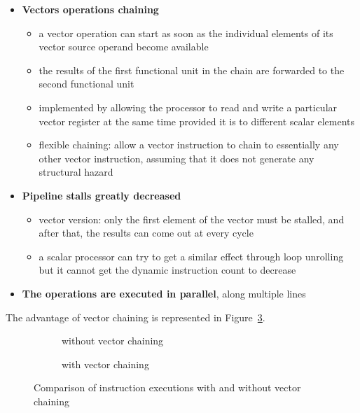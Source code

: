 \documentclass[english]{article}
\begin{document}
\begin{itemize}
  \item \textbf{Vectors operations chaining}
        \begin{itemize}
          \item a vector operation can start as soon as the individual elements of its vector source operand become available
          \item the results of the first functional unit in the chain are forwarded to the second functional unit
          \item implemented by allowing the processor to read and write a particular vector register at the same time provided it is to different scalar elements
          \item flexible chaining: allow a vector instruction to chain to essentially any other vector instruction, assuming that it does not generate any structural hazard
        \end{itemize}
  \item \textbf{Pipeline stalls greatly decreased}
        \begin{itemize}
          \item vector version: only the first element of the vector must be stalled, and after that, the results can come out at every cycle
          \item a scalar processor can try to get a similar effect through loop unrolling but it cannot get the dynamic instruction count to decrease
        \end{itemize}
  \item \textbf{The operations are executed in parallel}, along multiple lines
\end{itemize}

\bigskip
The advantage of vector chaining is represented in Figure~\ref{fig:vector-chaining}.

\begin{figure}[htbp]
  \bigskip
  \centering
  \begin{subfigure}[b]{0.495\textwidth}
    \centering
    \caption{without vector chaining}
    \label{subfig:wihtout-vector-chaining}
  \end{subfigure}
  \begin{subfigure}[b]{0.495\textwidth}
    \centering
    \caption{with vector chaining}
    \label{subfig:with-vector-chaining}
  \end{subfigure}
  \caption{Comparison of instruction executions with and without vector chaining}
  \label{fig:vector-chaining}
  \bigskip
\end{figure}
\end{document}
